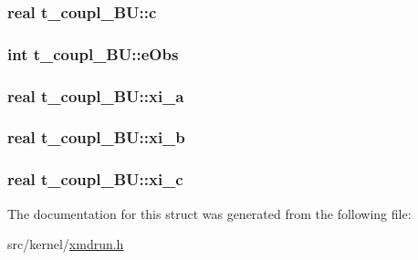 \hypertarget{structt__coupl__BU_ad5cbddf8045b20e2e20262772d50d166}{
\subsubsection[{c}]{\setlength{\rightskip}{0pt plus 5cm}real {\bf t\-\_\-coupl\-\_\-\-B\-U\-::c}}}\label{structt__coupl__BU_ad5cbddf8045b20e2e20262772d50d166}
\hypertarget{structt__coupl__BU_a3daa083952d2b33069f31868fbe5874b}{
\subsubsection[{e\-Obs}]{\setlength{\rightskip}{0pt plus 5cm}int {\bf t\-\_\-coupl\-\_\-\-B\-U\-::e\-Obs}}}\label{structt__coupl__BU_a3daa083952d2b33069f31868fbe5874b}
\hypertarget{structt__coupl__BU_ac165fb76a43cdaab33e37870f53b2c1d}{
\subsubsection[{xi\-\_\-a}]{\setlength{\rightskip}{0pt plus 5cm}real {\bf t\-\_\-coupl\-\_\-\-B\-U\-::xi\-\_\-a}}}\label{structt__coupl__BU_ac165fb76a43cdaab33e37870f53b2c1d}
\hypertarget{structt__coupl__BU_ac34a7d7d0ebfe5faf846ce437561a611}{
\subsubsection[{xi\-\_\-b}]{\setlength{\rightskip}{0pt plus 5cm}real {\bf t\-\_\-coupl\-\_\-\-B\-U\-::xi\-\_\-b}}}\label{structt__coupl__BU_ac34a7d7d0ebfe5faf846ce437561a611}
\hypertarget{structt__coupl__BU_abcdc5d0cea8db7fa532c735592ef4895}{
\subsubsection[{xi\-\_\-c}]{\setlength{\rightskip}{0pt plus 5cm}real {\bf t\-\_\-coupl\-\_\-\-B\-U\-::xi\-\_\-c}}}\label{structt__coupl__BU_abcdc5d0cea8db7fa532c735592ef4895}


\-The documentation for this struct was generated from the following file\-:\begin{DoxyCompactItemize}
\item 
src/kernel/\hyperlink{xmdrun_8h}{xmdrun.\-h}\end{DoxyCompactItemize}
